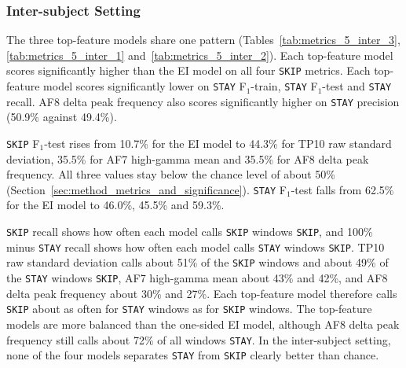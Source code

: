 \documentclass[12pt,a4paper]{report}
\begin{document}


\subsubsection{Inter-subject Setting}

The three top-feature models share one pattern (Tables~\ref{tab:metrics_5_inter_3}, \ref{tab:metrics_5_inter_1} and~\ref{tab:metrics_5_inter_2}). Each top-feature model scores significantly higher than the EI model on all four \texttt{SKIP} metrics. Each top-feature model scores significantly lower on \texttt{STAY} F\(_1\)-train, \texttt{STAY} F\(_1\)-test and \texttt{STAY} recall. AF8 delta peak frequency also scores significantly higher on \texttt{STAY} precision (50.9\% against 49.4\%).

\texttt{SKIP} F\(_1\)-test rises from 10.7\% for the EI model to 44.3\% for TP10 raw standard deviation, 35.5\% for AF7 high-gamma mean and 35.5\% for AF8 delta peak frequency. All three values stay below the chance level of about 50\% (Section~\ref{sec:method_metrics_and_significance}). \texttt{STAY} F\(_1\)-test falls from 62.5\% for the EI model to 46.0\%, 45.5\% and 59.3\%.

\texttt{SKIP} recall shows how often each model calls \texttt{SKIP} windows \texttt{SKIP}, and 100\% minus \texttt{STAY} recall shows how often each model calls \texttt{STAY} windows \texttt{SKIP}. TP10 raw standard deviation calls about 51\% of the \texttt{SKIP} windows and about 49\% of the \texttt{STAY} windows \texttt{SKIP}, AF7 high-gamma mean about 43\% and 42\%, and AF8 delta peak frequency about 30\% and 27\%. Each top-feature model therefore calls \texttt{SKIP} about as often for \texttt{STAY} windows as for \texttt{SKIP} windows. The top-feature models are more balanced than the one-sided EI model, although AF8 delta peak frequency still calls about 72\% of all windows \texttt{STAY}. In the inter-subject setting, none of the four models separates \texttt{STAY} from \texttt{SKIP} clearly better than chance.




\end{document}
